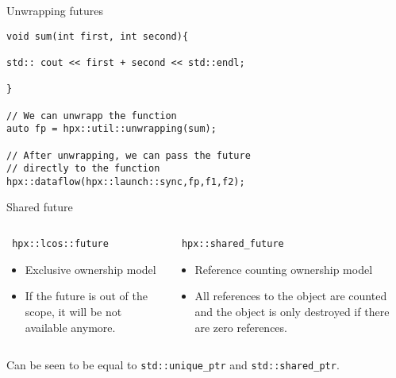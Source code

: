 \documentclass[\classoption]{beamer}
\begin{document}
\begin{frame}[fragile]{Unwrapping futures}

\begin{lstlisting}
void sum(int first, int second){

std:: cout << first + second << std::endl;

}

// We can unwrapp the function
auto fp = hpx::util::unwrapping(sum);

// After unwrapping, we can pass the future
// directly to the function
hpx::dataflow(hpx::launch::sync,fp,f1,f2);

\end{lstlisting}

\end{frame}


\begin{frame}[fragile]{Shared future}

\begin{columns}
\begin{column}{0.5\textwidth}
\begin{lstlisting}
 hpx::lcos::future
\end{lstlisting}
\begin{itemize}
\item Exclusive ownership model
\item If the future is out of the scope, it will be not available anymore.
\end{itemize}
\end{column}
\begin{column}{0.5\textwidth}  
    \begin{lstlisting}
 hpx::shared_future
\end{lstlisting}
\begin{itemize}
\item Reference counting ownership model
\item All references to the object are counted and the object is only destroyed if there are zero references.
\end{itemize}
\end{column}
\end{columns}
\vspace{.5cm}
\begin{center}
Can be seen to be equal to \lstinline|std::unique_ptr| and \lstinline|std::shared_ptr|.
\end{center}
\end{frame}

\end{document}
